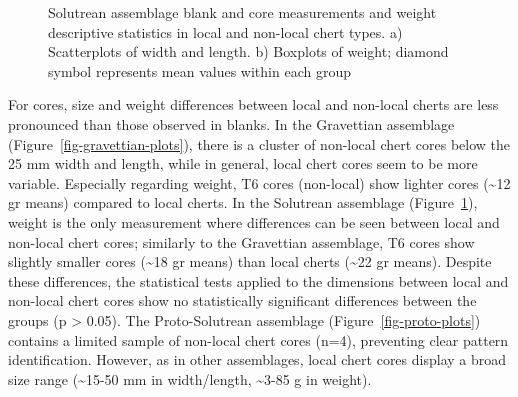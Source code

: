 \documentclass[
  a4paper,
  DIV=11,
  numbers=noendperiod]{scrreprt}
\begin{document}
\begin{figure}


\caption{\label{fig-solutrean-plots}Solutrean assemblage blank and core
measurements and weight descriptive statistics in local and non-local
chert types. a) Scatterplots of width and length. b) Boxplots of weight;
diamond symbol represents mean values within each group}

\end{figure}%

For cores, size and weight differences between local and non-local
cherts are less pronounced than those observed in blanks. In the
Gravettian assemblage (Figure~\ref{fig-gravettian-plots}), there is a
cluster of non-local chert cores below the 25 mm width and length, while
in general, local chert cores seem to be more variable. Especially
regarding weight, T6 cores (non-local) show lighter cores
(\textasciitilde12 gr means) compared to local cherts. In the Solutrean
assemblage (Figure~\ref{fig-solutrean-plots}), weight is the only
measurement where differences can be seen between local and non-local
chert cores; similarly to the Gravettian assemblage, T6 cores show
slightly smaller cores (\textasciitilde18 gr means) than local cherts
(\textasciitilde22 gr means). Despite these differences, the statistical
tests applied to the dimensions between local and non-local chert cores
show no statistically significant differences between the groups (p
\textgreater{} 0.05). The Proto-Solutrean assemblage
(Figure~\ref{fig-proto-plots}) contains a limited sample of non-local
chert cores (n=4), preventing clear pattern identification. However, as
in other assemblages, local chert cores display a broad size range
(\textasciitilde15-50 mm in width/length, \textasciitilde3-85 g in
weight).
\end{document}
